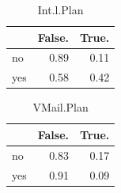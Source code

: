 \documentclass{article}\usepackage[]{graphicx}\usepackage[]{color}
\newenvironment{knitrout}{}{} %
\begin{document}
\begin{knitrout}
\color{fgcolor}\begin{table}[!h]

\caption{\label{tab:ilosciowe dla grup}Int.l.Plan}
\centering
\begin{tabular}[t]{l|r|r}
\hline
  & False. & True.\\
\hline
no & 0.89 & 0.11\\
\hline
yes & 0.58 & 0.42\\
\hline
\end{tabular}
\end{table}

\begin{table}[!h]

\caption{\label{tab:ilosciowe dla grup}VMail.Plan}
\centering
\begin{tabular}[t]{l|r|r}
\hline
  & False. & True.\\
\hline
no & 0.83 & 0.17\\
\hline
yes & 0.91 & 0.09\\
\hline
\end{tabular}
\end{table}


\end{knitrout}
\end{document}
